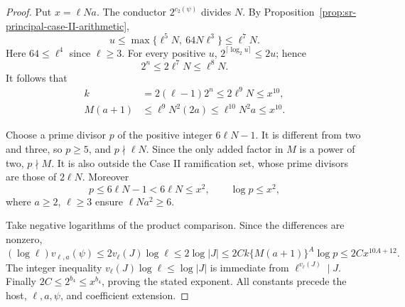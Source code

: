 \begin{proof}
Put \(x=\ell Na\). The conductor \(2^{c_2(\psi)}\) divides \(N\).
By Proposition~\ref{prop:sr-principal-case-II-arithmetic},
\[
 u\leq\max\{\ell^5N,\ 64N\ell^3\}\leq\ell^7N.
\]
Here \(64\leq\ell^4\) since \(\ell\geq3\).
For every positive \(u\), \(2^{\lceil\log_2u\rceil}\leq2u\);
hence
\[
                    2^n\leq2\ell^7N\leq\ell^8N.
\]
It follows that
\[
 \begin{split}
 k&=2(\ell-1)2^n\leq2\ell^9N\leq x^{10},\\
 M(a+1)&\leq\ell^9N^2(2a)
                    \leq\ell^{10}N^2a\leq x^{10}.
 \end{split}
\]

Choose a prime divisor \(p\) of the positive integer \(6\ell N-1\).
It is different from two and three, so \(p\geq5\), and
\(p\nmid\ell N\). Since the only added factor in \(M\) is a power
of two, \(p\nmid M\). It is also outside the Case II ramification
set, whose prime divisors are those of \(2\ell N\).
Moreover
\[
       p\leq6\ell N-1<6\ell N\leq x^2,\qquad \log p\leq x^2,
\]
where \(a\geq2\), \(\ell\geq3\) ensure \(\ell Na^2\geq6\).

Take negative logarithms of the product comparison. Since the
differences are nonzero,
\[
 (\log\ell)v_{\ell,a}(\psi)
       \leq2v_\ell(J)\log\ell
       \leq2\log|J|
       \leq2Ck\{M(a+1)\}^{A}\log p
       \leq2C x^{10A+12}.
\]
The integer inequality \(v_\ell(J)\log\ell\leq\log|J|\) is immediate
from \(\ell^{v_\ell(J)}\mid J\). Finally
\(2C\leq2^{b_4}\leq x^{b_4}\), proving the stated exponent.
All constants precede the host, \(\ell,a,\psi\), and coefficient
extension.
\end{proof}

